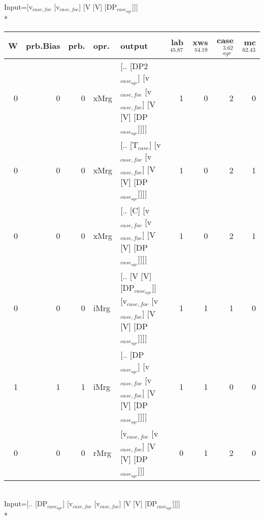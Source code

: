 \begingroup\scriptsize Input=[v$_{case,foc}$ [v$_{case,foc}$] [V [V] [DP$_{case_{agr}}$]]]\\*
\begin{tabularx}{\linewidth}{rrrlXrrrr}
\hline
   W &   prb.Bias &   prb. & opr.   & output                                                                     &   lab$^{45.87}$ &   xws$^{54.19}$ &   case$_{agr}^{3.62}$ &   mc$^{62.43}$ \\
\hline
   0 &       0 &   0 & xMrg & [.. [DP2$_{case_{agr}}$] [v$_{case,foc}$ [v$_{case,foc}$] [V [V] [DP$_{case_{agr}}$]]]]        &             1 &             0 &                  2 &            0 \\
   0 &       0 &   0 & xMrg & [.. [T$_{case}$] [v$_{case,foc}$ [v$_{case,foc}$] [V [V] [DP$_{case_{agr}}$]]]]              &             1 &             0 &                  2 &            1 \\
   0 &       0 &   0 & xMrg & [.. [C] [v$_{case,foc}$ [v$_{case,foc}$] [V [V] [DP$_{case_{agr}}$]]]]                   &             1 &             0 &                  2 &            1 \\
   0 &       0 &   0 & iMrg & [.. [V [V] [DP$_{case_{agr}}$]] [v$_{case,foc}$ [v$_{case,foc}$] [V [V] [DP$_{case_{agr}}$]]]] &             1 &             1 &                  1 &            0 \\
   1 &       1 &   1 & iMrg & [.. [DP$_{case_{agr}}$] [v$_{case,foc}$ [v$_{case,foc}$] [V [V] [DP$_{case_{agr}}$]]]]         &             1 &             1 &                  0 &            0 \\
   0 &       0 &   0 & rMrg & [v$_{case,foc}$ [v$_{case,foc}$] [V [V] [DP$_{case_{agr}}$]]]                            &             0 &             1 &                  2 &            0 \\
\hline
\end{tabularx}\endgroup\\
\begingroup\scriptsize Input=[.. [DP$_{case_{agr}}$] [v$_{case,foc}$ [v$_{case,foc}$] [V [V] [DP$_{case_{agr}}$]]]]\\*
